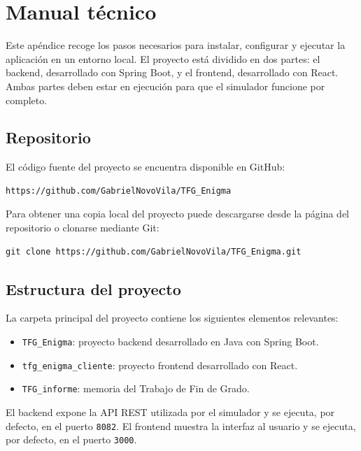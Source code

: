 \chapter{Manual técnico}
\label{apendice_manual_tecnico}

Este apéndice recoge los pasos necesarios para instalar, configurar y ejecutar la aplicación en un entorno local. El proyecto está dividido en dos partes: el backend, desarrollado con Spring Boot, y el frontend, desarrollado con React. Ambas partes deben estar en ejecución para que el simulador funcione por completo.

\section{Repositorio}

El código fuente del proyecto se encuentra disponible en GitHub:

\begin{lstlisting}
https://github.com/GabrielNovoVila/TFG_Enigma
\end{lstlisting}

Para obtener una copia local del proyecto puede descargarse desde la página del repositorio o clonarse mediante Git:

\begin{lstlisting}
git clone https://github.com/GabrielNovoVila/TFG_Enigma.git
\end{lstlisting}

\section{Estructura del proyecto}

La carpeta principal del proyecto contiene los siguientes elementos relevantes:

\begin{itemize}
	\item \texttt{TFG\_Enigma}: proyecto backend desarrollado en Java con Spring Boot.
	\item \texttt{tfg\_enigma\_cliente}: proyecto frontend desarrollado con React.
	\item \texttt{TFG\_informe}: memoria del Trabajo de Fin de Grado.
\end{itemize}

El backend expone la API REST utilizada por el simulador y se ejecuta, por defecto, en el puerto \texttt{8082}. El frontend muestra la interfaz al usuario y se ejecuta, por defecto, en el puerto \texttt{3000}.

